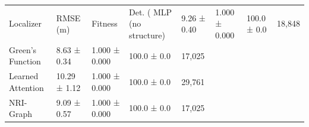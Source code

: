 \begin{tabular}{lllll}
\toprule
Localizer & RMSE (m) & Fitness & Det. (%
\midrule
MLP (no structure) & 9.26 ± 0.40 & 1.000 ± 0.000 & 100.0 ± 0.0 & 18,848 \\
Green's Function & 8.63 ± 0.34 & 1.000 ± 0.000 & 100.0 ± 0.0 & 17,025 \\
Learned Attention & 10.29 ± 1.12 & 1.000 ± 0.000 & 100.0 ± 0.0 & 29,761 \\
NRI-Graph & 9.09 ± 0.57 & 1.000 ± 0.000 & 100.0 ± 0.0 & 17,025 \\
\bottomrule
\end{tabular}
